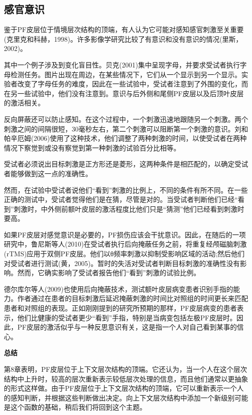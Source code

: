 \subsection{感官意识}
鉴于PF皮层位于情境层次结构的顶端，有人认为它可能对感知感官刺激至关重要(克里克和科赫，1998)。许多影像学研究比较了有意识和没有意识的情况(里斯，2002)。
\par
其中一个例子涉及到变化盲目性。贝克(2001)集中呈现字母，并要求受试者执行字母检测任务。图片出现在周边，在某些情况下，它们从一个显示到另一个显示。实验者改变了字母任务的难度，因此在一些试验中，受试者注意到了外围的变化，而在另一些试验中，他们没有注意到。意识与后外侧和尾侧PF皮层以及后顶叶皮层的激活相关。
\par
反向屏蔽还可以防止感知。在这个过程中，一个刺激迅速地跟随另一个刺激。两个刺激之间的间隔很短，30毫秒左右，第二个刺激可以阻断第一个刺激的意识。刘和帕辛厄姆(2006)使用了这种技术，他们调整了两种刺激的时间，以使受试者在两种情况下察觉到或没有察觉到第一种刺激的试验百分比相等。
\par
受试者必须说出目标刺激是正方形还是菱形，这两种条件是相匹配的，以确定受试者能够做到这一点的准确性。
\par
然而，在试验中受试者说他们“看到”刺激的比例上，不同的条件有所不同。在一些正确的测试中，受试者觉得他们是在猜，尽管是对的。当受试者判断他们已经“看到”刺激时，中外侧前额叶皮层的激活程度比他们只是“猜测”他们已经看到刺激时要高。
\par
如果PF皮层对感觉意识是必要的，PF损伤应该会干扰意识。因此，在随后的一项研究中，鲁尼斯等人(2010)在受试者执行后向掩蔽任务之前，将重复经颅磁脑刺激(rTMS)应用于双侧PF皮层。他们以θ频率刺激以抑制受影响区域的活动;然后他们对受试者进行测试(黄，2005)。暂时的失活对受试者判断目标刺激的准确性没有影响。然而，它确实影响了受试者报告他们“看到”刺激的试验比例。
\par
德尔库尔等人(2009)也使用后向掩蔽技术，测试额叶皮层病变患者识别手指的能力。作者通过在患者的目标刺激后延迟掩蔽刺激的时间比对照组的时间更长来匹配患者和对照组的表现。正如刚刚提到的研究所预期的那样，PF皮层病变的患者表示，他们比健康的受试者更少“看到”手指，特别是当病变包括左极PF皮层时。因此，PF皮层的激活似乎与一种反思意识有关，这是指一个人对自己看到某事的信心。
\par
\textbf{总结}
\par
第8章表明，PF皮层位于上下文层次结构的顶端。它还认为，当一个人在这个层次结构中上升时，较高的层次重新表示较低层次处理的信息，而且他们通常以更抽象的形式这样做。由于PF皮层位于上下文层次结构的顶端，它可以重新表示一个人的感知判断，并根据这些判断做出决定。向上下文层次结构中添加一个新级别可能是这个函数的基础，稍后我们将回到这个主题。


